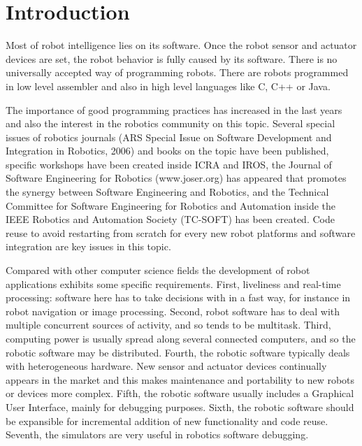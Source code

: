\documentclass[twocolumn]{svjour3}          %
\begin{document}
\section{Introduction}
\label{intro}

Most of robot intelligence lies on its software. Once the robot sensor and actuator devices are set, the robot behavior is fully caused by its software. There is no universally accepted way of programming robots. There are robots programmed in low level assembler and also in high level languages like C, C++ or Java. 

The importance of good programming practices has increased in the last years and also the interest in the robotics community on this topic. Several special issues of robotics journals (ARS Special Issue on Software Development and Integration in Robotics, 2006) and books on the topic \cite{brugali2007} have been published, specific workshops have been created inside ICRA and IROS, the Journal of Software Engineering for Robotics (www.joser.org) has appeared that promotes the synergy between Software Engineering and Robotics, and the Technical Committee for Software Engineering for Robotics and Automation inside the IEEE Robotics and Automation Society (TC-SOFT) has been created. Code reuse to avoid restarting from scratch for every new robot platforms and software integration are key issues in this topic. 


Compared with other computer science fields the development of robot applications exhibits some specific requirements. First, liveliness and real-time processing: software here has to take decisions with in a fast way, for instance in robot navigation or image processing. Second, robot software has to deal with multiple concurrent sources of activity, and so tends to be multitask. Third, computing power is usually spread along several connected computers, and so the robotic software may be distributed. Fourth, the robotic software typically deals with heterogeneous hardware. New sensor and actuator devices continually appears in the market and this makes maintenance and portability to new robots or devices more complex. Fifth, the robotic software usually includes a Graphical User Interface, mainly for debugging purposes. Sixth, the robotic software should be expansible for incremental addition of new functionality and code reuse. Seventh, the simulators are very useful in robotics software debugging.
\end{document}
